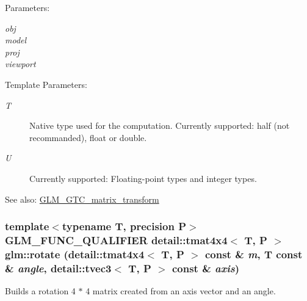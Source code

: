 \begin{Desc}
\item[Parameters:]
\begin{description}
\item[{\em obj}]\item[{\em model}]\item[{\em proj}]\item[{\em viewport}]\end{description}
\end{Desc}
\begin{Desc}
\item[Template Parameters:]
\begin{description}
\item[{\em T}]Native type used for the computation. Currently supported: half (not recommanded), float or double. \item[{\em U}]Currently supported: Floating-point types and integer types. \end{description}
\end{Desc}
\begin{Desc}
\item[See also:]\hyperlink{group__gtc__matrix__transform}{GLM\_\-GTC\_\-matrix\_\-transform} \end{Desc}
\hypertarget{group__gtc__matrix__transform_g1a75da872120125437265872423e0b14}{
\subsubsection[rotate]{\setlength{\rightskip}{0pt plus 5cm}template$<$typename T, precision P$>$ GLM\_\-FUNC\_\-QUALIFIER detail::tmat4x4$<$ T, P $>$ glm::rotate (detail::tmat4x4$<$ T, P $>$ const \& {\em m}, \/  T const \& {\em angle}, \/  detail::tvec3$<$ T, P $>$ const \& {\em axis})}}
\label{group__gtc__matrix__transform_g1a75da872120125437265872423e0b14}


Builds a rotation 4 $\ast$ 4 matrix created from an axis vector and an angle.

